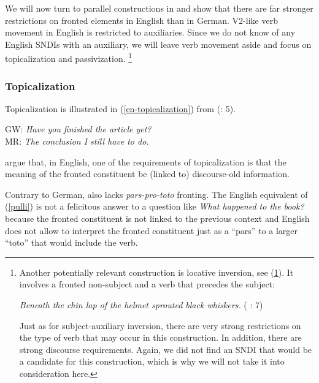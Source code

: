 \documentclass[output=paper]{langsci/langscibook}
\begin{document}
We will now turn to  parallel constructions in  and show that there are far stronger restrictions on fronted elements in English than in  German. V2-like verb movement in English is restricted to auxiliaries. Since we do not know of any English SNDIs with an auxiliary, we will leave verb movement aside and focus on  topicalization and passivization.%
\footnote{Another potentially relevant construction is locative inversion, see (\ref{en-inversion}). It involves a fronted non-subject and a verb that precedes the subject:

\begin{exe}%
\ex 
\textit{Beneath the chin lap of the helmet sprouted black whiskers.} (\citeauthor{Ward:Birner:94} \citeyear{Ward:Birner:94}: 7)\label{en-inversion}
\end{exe}

Just as for subject-auxiliary inversion, there are very strong restrictions on the type of verb that may occur in this construction. In addition, there are strong discourse requirements. Again, we did not find an SNDI that would be a candidate for this construction, which is why we will not take it into consideration here.}



\subsubsection{Topicalization}

Topicalization is illustrated in (\ref{en-topicalization}) from %
\citeauthor{Ward:Birner:94} (\citeyear{Ward:Birner:94}: 5).

\begin{exe}
\ex\label{en-topicalization} 
GW: \textit{Have you finished the article yet?}\\
MR: \textit{The conclusion I still have to do.}
\end{exe}

\cite{Ward:Birner:94} argue that, in English, one of the requirements of topicali\-zation is that the meaning of the fronted constituent be (linked to) discourse-old information.

Contrary to German,  also lacks \textit{pars-pro-toto} fronting. The English equivalent of (\ref{pulli}) is not a felicitous answer to a question like \textit{What happened to the book?} because the fronted constituent is not linked to the previous context and English does not allow to interpret the fronted constituent just as a ``pars'' to a larger ``toto'' that would include the verb.
\end{document}
